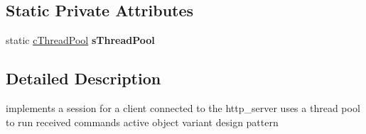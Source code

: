 \subsection*{\-Static \-Private \-Attributes}
\begin{DoxyCompactItemize}
\item 
\hypertarget{classengine_1_1cSession_a2f0a00f5302fdf8d88d4738c448ce4fa}{static \hyperlink{classengine_1_1cThreadPool}{c\-Thread\-Pool} {\bfseries s\-Thread\-Pool}}\label{classengine_1_1cSession_a2f0a00f5302fdf8d88d4738c448ce4fa}

\end{DoxyCompactItemize}


\subsection{\-Detailed \-Description}
implements a session for a client connected to the http\-\_\-server uses a thread pool to run received commands active object variant design pattern 

